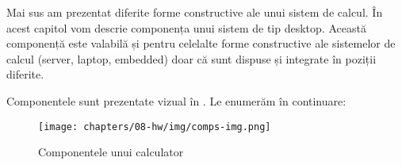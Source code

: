 Mai sus am prezentat diferite forme constructive ale unui sistem
de calcul. În acest capitol vom descrie componența unui sistem de tip desktop.
Această componență este valabilă și pentru celelalte forme constructive ale
sistemelor de calcul (server, laptop, embedded) doar că sunt dispuse și
integrate în poziții diferite.

Componentele sunt prezentate vizual în . Le enumerăm în continuare:

\begin{figure}[!htbp]
  \centering
  \texttt{[image: chapters/08-hw/img/comps-img.png]}
  \caption{Componentele unui calculator\protect\footnotemark}
  \label{fig:hw:components}
\end{figure}

